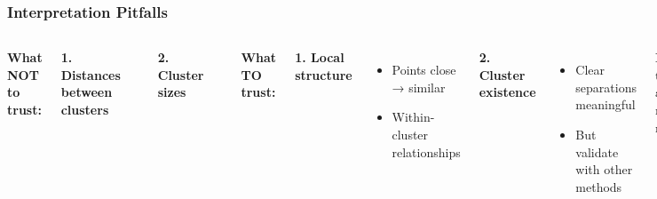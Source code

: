 \documentclass[aspectratio=169]{beamer}
\begin{document}
\begin{frame}
\frametitle{Interpretation Pitfalls}
\begin{columns}[T]
\textbf{What NOT to trust:}

\textbf{1. Distances between clusters}
\begin{center}
\end{center}

\textbf{2. Cluster sizes}
\begin{center}
\end{center}

\textbf{What TO trust:}

\textbf{1. Local structure}
\begin{itemize}
\small
\item Points close → similar
\item Within-cluster relationships
\end{itemize}

\textbf{2. Cluster existence}
\begin{itemize}
\small
\item Clear separations meaningful
\item But validate with other methods
\end{itemize}

\vspace{0.3cm}
\textbf{Remember:}\\
\small t-SNE creates a useful map,\\
not a perfect representation
\end{columns}
\end{frame}
\end{document}
